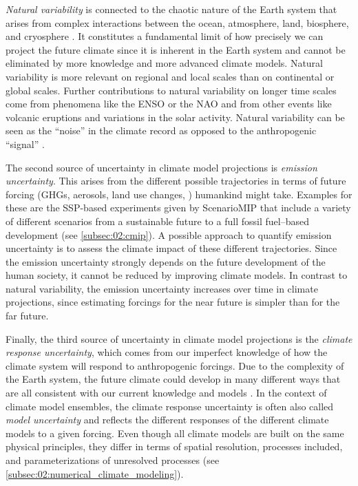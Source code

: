 \emph{Natural variability} is connected to the chaotic nature of the Earth
system that arises from complex interactions between the ocean, atmosphere,
land, biosphere, and cryosphere \autocite{Cubasch2013}. It constitutes a
fundamental limit of how precisely we can project the future climate since it
is inherent in the Earth system and cannot be eliminated by more knowledge and
more advanced climate models. Natural variability is more relevant on regional
and local scales than on continental or global scales. Further contributions to
natural variability on longer time scales come from phenomena like the
\ac{ENSO} or the \ac{NAO} and from other events like volcanic eruptions and
variations in the solar activity. Natural variability can be seen as the
\enquote{noise} in the climate record as opposed to the anthropogenic
\enquote{signal} \autocite{Cubasch2013}.

The second source of uncertainty in climate model projections is \emph{emission
  uncertainty}. This arises from the different possible trajectories in terms
of future forcing (\acp{GHG}, aerosols, land use changes, \etc{}) humankind
might take. Examples for these are the \ac{SSP}-based experiments given by
\ac{ScenarioMIP} that include a variety of different scenarios from a
sustainable future to a full fossil fuel--based development (see
\cref{subsec:02:cmip}). A possible approach to quantify emission uncertainty is
to assess the climate impact of these different trajectories. Since the
emission uncertainty strongly depends on the future development of the human
society, it cannot be reduced by improving climate models. In contrast to
natural variability, the emission uncertainty increases over time in climate
projections, since estimating forcings for the near future is simpler than for
the far future.

Finally, the third source of uncertainty in climate model projections is the
\emph{climate response uncertainty}, which comes from our imperfect knowledge
of how the climate system will respond to anthropogenic forcings. Due to the
complexity of the Earth system, the future climate could develop in many
different ways that are all consistent with our current knowledge and models
\autocite{Cubasch2013}. In the context of climate model ensembles, the climate
response uncertainty is often also called \emph{model uncertainty} and reflects
the different responses of the different climate models to a given forcing.
Even though all climate models are built on the same physical principles, they
differ in terms of spatial resolution, processes included, and
parameterizations of unresolved processes (see
\cref{subsec:02:numerical_climate_modeling}).

